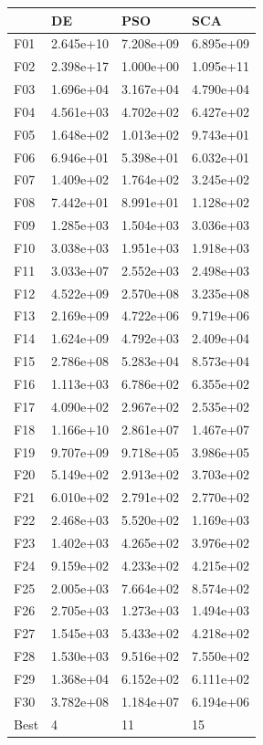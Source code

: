 \begin{tabular}{llll}
\toprule
{} &         DE &        PSO &        SCA \\
\midrule
F01  &  2.645e+10 &  7.208e+09 &  6.895e+09 \\
F02  &  2.398e+17 &  1.000e+00 &  1.095e+11 \\
F03  &  1.696e+04 &  3.167e+04 &  4.790e+04 \\
F04  &  4.561e+03 &  4.702e+02 &  6.427e+02 \\
F05  &  1.648e+02 &  1.013e+02 &  9.743e+01 \\
F06  &  6.946e+01 &  5.398e+01 &  6.032e+01 \\
F07  &  1.409e+02 &  1.764e+02 &  3.245e+02 \\
F08  &  7.442e+01 &  8.991e+01 &  1.128e+02 \\
F09  &  1.285e+03 &  1.504e+03 &  3.036e+03 \\
F10  &  3.038e+03 &  1.951e+03 &  1.918e+03 \\
F11  &  3.033e+07 &  2.552e+03 &  2.498e+03 \\
F12  &  4.522e+09 &  2.570e+08 &  3.235e+08 \\
F13  &  2.169e+09 &  4.722e+06 &  9.719e+06 \\
F14  &  1.624e+09 &  4.792e+03 &  2.409e+04 \\
F15  &  2.786e+08 &  5.283e+04 &  8.573e+04 \\
F16  &  1.113e+03 &  6.786e+02 &  6.355e+02 \\
F17  &  4.090e+02 &  2.967e+02 &  2.535e+02 \\
F18  &  1.166e+10 &  2.861e+07 &  1.467e+07 \\
F19  &  9.707e+09 &  9.718e+05 &  3.986e+05 \\
F20  &  5.149e+02 &  2.913e+02 &  3.703e+02 \\
F21  &  6.010e+02 &  2.791e+02 &  2.770e+02 \\
F22  &  2.468e+03 &  5.520e+02 &  1.169e+03 \\
F23  &  1.402e+03 &  4.265e+02 &  3.976e+02 \\
F24  &  9.159e+02 &  4.233e+02 &  4.215e+02 \\
F25  &  2.005e+03 &  7.664e+02 &  8.574e+02 \\
F26  &  2.705e+03 &  1.273e+03 &  1.494e+03 \\
F27  &  1.545e+03 &  5.433e+02 &  4.218e+02 \\
F28  &  1.530e+03 &  9.516e+02 &  7.550e+02 \\
F29  &  1.368e+04 &  6.152e+02 &  6.111e+02 \\
F30  &  3.782e+08 &  1.184e+07 &  6.194e+06 \\
Best &          4 &         11 &         15 \\
\bottomrule
\end{tabular}
